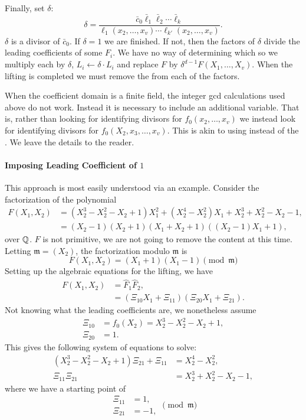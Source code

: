 Finally, set $\delta$:
\[
\delta = \frac{\bar{c}_0 \bar{\ell}_1 \bar{\ell}_2 \cdots
\bar{\ell}_k}{\ell_1(x_2, \ldots, x_v) \cdots \ell_{k'}(x_2, \ldots,
x_v)}.
\]
$\delta$ is a divisor of $\bar{c}_0$.  If $\delta = 1$ we are
finished.  If not, then the factors of $\delta$ divide the leading
coefficients of some $F_i$.  We have no way of determining which so we
multiply each by $\delta$, $L_i \leftarrow \delta \cdot L_i$ and
replace $F$ by $\delta^{d-1}F(X_1, \ldots, X_v)$.  When the lifting is
completed we must remove the  from each of the
factors. 

\medskip
When the coefficient domain is a finite field, the integer {\sc gcd}
calculations used above do not work.  Instead it is necessary to
include an additional variable.  That is, rather than looking for
identifying divisors for $f_0(x_2, \ldots, x_v)$ we instead look for
identifying divisors for $f_0(X_2, x_3, \ldots, x_v)$.  This is akin
to using  instead of the .  We leave the details to the reader.

\paragraph{Imposing Leading Coefficient of $1$}

This approach is most easily understood via an example.  Consider the
factorization of the polynomial
\[
\begin{aligned}
F(X_1, X_2) & = (X_2^3 - X_2^2 - X_2 + 1)X_1^2 + (X_2^4 - X_2^2) X_1 +
X_2^3 + X_2^2 - X_2 - 1, \\
& = (X_2 - 1) (X_2 + 1) (X_1 + X_2 + 1) ((X_2 - 1)X_1 + 1),
\end{aligned}
\]
over $\mathbb{Q}$.
$F$ is not primitive, we are not going to remove the content at this
time.  Letting $\mathfrak{m} = (X_2)$, the factorization modulo $\mathfrak{m}$ is 
\[
F(X_1, X_2) = (X_1 + 1) (X_1 - 1) \pmod{\mathfrak{m}}
\]
Setting up the algebraic equations for the lifting, we have
\[
\begin{aligned}
F(X_1, X_2)  & = \hat{F}_1 \hat{F}_2, \\
& = (\Xi_{10} X_1 + \Xi_{11})(\Xi_{20} X_1 + \Xi_{21}).
\end{aligned}
\]
Not knowing what the leading coefficients are, we nonetheless assume
\[
\begin{aligned}
\Xi_{10} & = f_{0}(X_2) = X_2^3 - X_2^2 - X_2 + 1, \\
\Xi_{20} & = 1.
\end{aligned}
\]
This gives the following system of equations to solve:
\[
\begin{aligned}
(X_2^3 - X_2^2 - X_2 + 1)\Xi_{21} + \Xi_{11} & = X_2^4 - X_2^2, \\
\Xi_{11} \Xi_{21} & = X_2^3 + X_2^2 -X_2 -1,
\end{aligned}
\]
where we have a starting point of 
\[
\begin{aligned}
\Xi_{11} & = 1, \\
\Xi_{21} & = -1,
\end{aligned}
\pmod{\mathfrak{m}}
\]


